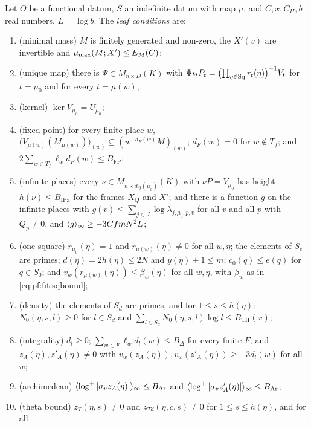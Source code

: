 \begin{definition}\label{pf:fit:leafconds}
Let $O$ be a functional datum, $S$ an indefinite datum with map $\mu$, and $C,x,C_H,b$ real numbers, $L=\log b$. The
\emph{leaf conditions} are:
\begin{enumerate}[label=(L\arabic*),leftmargin=*]
\item\label{pf:fit:L:MM} (minimal mass) $M$ is finitely generated and non-zero, the $X'(v)$ are invertible and
$\mu_{\max}(M;X')\le E_M(C)$;
\item\label{pf:fit:L:C} (unique map) there is $\Psi\in M_{n\times D}(K)$ with
$\Psi\iota_tP_t=\bigl(\prod_{\eta\in\mathrm{Sq}}r_t(\eta)\bigr)^{-1}V_t$ for $t=\mu_0$ and for every $t=\mu(w)$;
\item\label{pf:fit:L:Ker} (kernel) $\ker V_{\mu_0}=U_{\mu_0}$;
\item\label{pf:fit:L:FP} (fixed point) for every finite place $w$,
$\bigl(V_{\mu(w)}(M_{\mu(w)})\bigr)_{(w)}\subseteq(w^{-d_F(w)}M)_{(w)}$; $d_F(w)=0$ for $w\notin T_f$; and
$2\sum_{w\in T_f}\ell_wd_F(w)\le B_{\mathrm{FP}}$;
\item\label{pf:fit:L:IP} (infinite places) every $\nu\in M_{n\times d_Q(\mu_0)}(K)$ with $\nu P=V_{\mu_0}$ has
height $h(\nu)\le B_{\mathrm{IPa}}$ for the frames $X_Q$ and $X'$; and there is a function $g$ on the infinite places
with $g(v)\le\sum_{j\in J}\log\lambda_{j,\mu_0,p,v}$ for all $v$ and all $p$ with $Q_p\ne0$, and
$\langle g\rangle_{\infty}\ge-3CfmN^2L$;
\item\label{pf:fit:L:Sq} (one square) $r_{\mu_0}(\eta)=1$ and $r_{\mu(w)}(\eta)\ne0$ for all $w,\eta$; the elements of
$S_e$ are primes; $d(\eta)=2h(\eta)\le2N$ and $y(\eta)+1\le m$; $c_0(q)\le e(q)$ for $q\in S_0$; and
$v_w(r_{\mu(w)}(\eta))\le\beta_w(\eta)$ for all $w,\eta$, with $\beta_w$ as in \eqref{eq:pf:fit:sqbound};
\item\label{pf:fit:L:Den} (density) the elements of $S_d$ are primes, and for $1\le s\le h(\eta)$:
$N_0(\eta,s,l)\ge0$ for $l\in S_d$ and $\sum_{l\in S_d}N_0(\eta,s,l)\log l\le B_{\mathrm{TH}}(x)$;
\item\label{pf:fit:L:Int} (integrality) $d_l\ge0$; $\sum_{w\in F}\ell_wd_l(w)\le B_\Delta$ for every finite $F$; and
$z_A(\eta),z'_A(\eta)\ne0$ with $v_w(z_A(\eta)),v_w(z'_A(\eta))\ge-3d_l(w)$ for all $w$;
\item\label{pf:fit:L:Arch} (archimedean) $\langle \log^+|\sigma_vz_A(\eta)|\rangle_{\infty}\le B_{\mathrm{Ar}}$ and
$\langle \log^+|\sigma_vz'_A(\eta)|\rangle_{\infty}\le B_{\mathrm{Ar}}$;
\item\label{pf:fit:L:Thb} (theta bound) $z_T(\eta,s)\ne0$ and $z_{Td}(\eta,c,s)\ne0$ for $1\le s\le h(\eta)$, and for all

\end{enumerate}
\end{definition}
